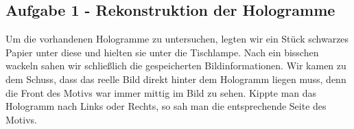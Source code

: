 \subsection*{Aufgabe 1 - Rekonstruktion der Hologramme}
Um die vorhandenen Hologramme zu untersuchen, legten wir ein Stück schwarzes Papier unter diese und hielten sie unter die Tischlampe. Nach ein bisschen wackeln sahen wir schließlich die gespeicherten Bildinformationen. Wir kamen zu dem Schuss, dass das reelle Bild direkt hinter dem Hologramm liegen muss, denn die Front des Motivs war immer mittig im Bild zu sehen. Kippte man das Hologramm nach Links oder Rechts, so sah man die entsprechende Seite des Motivs. 